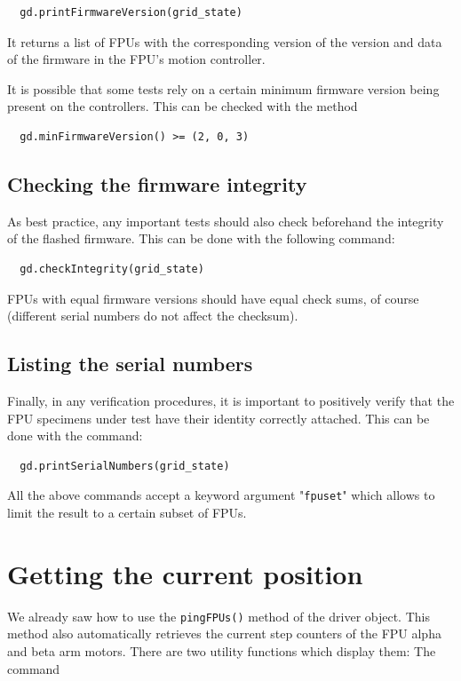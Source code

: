 \documentclass[fontsize=12,a4paper]{scrreprt}
\begin{document}
\begin{verbatim}
  gd.printFirmwareVersion(grid_state)
\end{verbatim}

It returns a list of FPUs with the corresponding version of the
version and data of the firmware in the FPU's motion controller.

It is possible that some tests rely on a certain minimum
firmware version being present on the controllers.
This can be checked with the method

\begin{verbatim}
  gd.minFirmwareVersion() >= (2, 0, 3)
\end{verbatim}


\subsection{Checking the firmware integrity}

As best practice, any important tests should also check beforehand
the integrity of the flashed firmware. This can be done with
the following command:

\begin{verbatim}
  gd.checkIntegrity(grid_state)
\end{verbatim}

FPUs with equal firmware versions should have equal check sums, of
course (different serial numbers do not affect the checksum).

\subsection{Listing the serial numbers}

Finally, in any verification procedures, it is important to positively
verify that the FPU specimens under test have their identity correctly
attached. This can be done with the command:

\begin{verbatim}
  gd.printSerialNumbers(grid_state)
\end{verbatim}

All the above commands accept a keyword argument "\texttt{fpuset}"
which allows to limit the result to a certain subset of FPUs.


\section{Getting the current position}
   We already saw how to use
the \texttt{pingFPUs()} method of the driver object. This method also
automatically retrieves the current step counters of the FPU alpha and
beta arm motors.  There are two utility functions which display them:
The command
\end{document}
